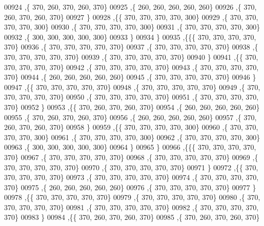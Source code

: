 \begin{DoxyCode}
00924    ,\{   370,   260,   370,   260,   370\}
00925    ,\{   260,   260,   260,   260,   260\}
00926    ,\{   370,   260,   370,   260,   370\}
00927    \}
00928   ,\{\{   370,   370,   370,   370,   300\}
00929    ,\{   370,   370,   370,   370,   300\}
00930    ,\{   370,   370,   370,   370,   300\}
00931    ,\{   370,   370,   370,   370,   300\}
00932    ,\{   300,   300,   300,   300,   300\}
00933    \}
00934   \}
00935  ,\{\{\{   370,   370,   370,   370,   370\}
00936    ,\{   370,   370,   370,   370,   370\}
00937    ,\{   370,   370,   370,   370,   370\}
00938    ,\{   370,   370,   370,   370,   370\}
00939    ,\{   370,   370,   370,   370,   370\}
00940    \}
00941   ,\{\{   370,   370,   370,   370,   370\}
00942    ,\{   370,   370,   370,   370,   370\}
00943    ,\{   370,   370,   370,   370,   370\}
00944    ,\{   260,   260,   260,   260,   260\}
00945    ,\{   370,   370,   370,   370,   370\}
00946    \}
00947   ,\{\{   370,   370,   370,   370,   370\}
00948    ,\{   370,   370,   370,   370,   370\}
00949    ,\{   370,   370,   370,   370,   370\}
00950    ,\{   370,   370,   370,   370,   370\}
00951    ,\{   370,   370,   370,   370,   370\}
00952    \}
00953   ,\{\{   370,   260,   370,   260,   370\}
00954    ,\{   260,   260,   260,   260,   260\}
00955    ,\{   370,   260,   370,   260,   370\}
00956    ,\{   260,   260,   260,   260,   260\}
00957    ,\{   370,   260,   370,   260,   370\}
00958    \}
00959   ,\{\{   370,   370,   370,   370,   300\}
00960    ,\{   370,   370,   370,   370,   300\}
00961    ,\{   370,   370,   370,   370,   300\}
00962    ,\{   370,   370,   370,   370,   300\}
00963    ,\{   300,   300,   300,   300,   300\}
00964    \}
00965   \}
00966  ,\{\{\{   370,   370,   370,   370,   370\}
00967    ,\{   370,   370,   370,   370,   370\}
00968    ,\{   370,   370,   370,   370,   370\}
00969    ,\{   370,   370,   370,   370,   370\}
00970    ,\{   370,   370,   370,   370,   370\}
00971    \}
00972   ,\{\{   370,   370,   370,   370,   370\}
00973    ,\{   370,   370,   370,   370,   370\}
00974    ,\{   370,   370,   370,   370,   370\}
00975    ,\{   260,   260,   260,   260,   260\}
00976    ,\{   370,   370,   370,   370,   370\}
00977    \}
00978   ,\{\{   370,   370,   370,   370,   370\}
00979    ,\{   370,   370,   370,   370,   370\}
00980    ,\{   370,   370,   370,   370,   370\}
00981    ,\{   370,   370,   370,   370,   370\}
00982    ,\{   370,   370,   370,   370,   370\}
00983    \}
00984   ,\{\{   370,   260,   370,   260,   370\}
00985    ,\{   370,   260,   370,   260,   370\}

\end{DoxyCode}

